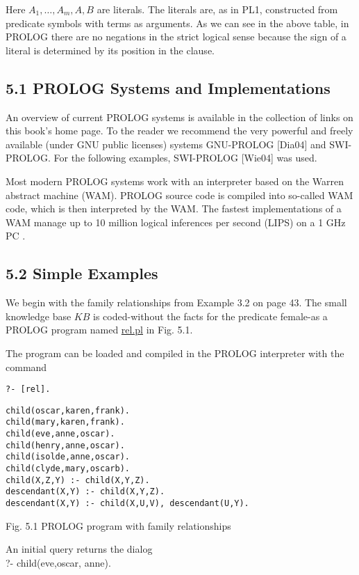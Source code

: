 \documentclass[10pt]{article}
\begin{document}
Here $A_{1}, \ldots, A_{m}, A, B$ are literals. The literals are, as in PL1, constructed from predicate symbols with terms as arguments. As we can see in the above table, in PROLOG there are no negations in the strict logical sense because the sign of a literal is determined by its position in the clause.

\subsection*{5.1 PROLOG Systems and Implementations}
An overview of current PROLOG systems is available in the collection of links on this book's home page. To the reader we recommend the very powerful and freely available (under GNU public licenses) systems GNU-PROLOG [Dia04] and SWI-PROLOG. For the following examples, SWI-PROLOG [Wie04] was used.

Most modern PROLOG systems work with an interpreter based on the Warren abstract machine (WAM). PROLOG source code is compiled into so-called WAM code, which is then interpreted by the WAM. The fastest implementations of a WAM manage up to 10 million logical inferences per second (LIPS) on a 1 GHz PC .

\subsection*{5.2 Simple Examples}
We begin with the family relationships from Example 3.2 on page 43. The small knowledge base $K B$ is coded-without the facts for the predicate female-as a PROLOG program named \href{http://rel.pl}{rel.pl} in Fig. 5.1.

The program can be loaded and compiled in the PROLOG interpreter with the command

\begin{verbatim}
?- [rel].
\end{verbatim}

\begin{verbatim}
child(oscar,karen,frank).
child(mary,karen,frank).
child(eve,anne,oscar).
child(henry,anne,oscar).
child(isolde,anne,oscar).
child(clyde,mary,oscarb).
child(X,Z,Y) :- child(X,Y,Z).
descendant(X,Y) :- child(X,Y,Z).
descendant(X,Y) :- child(X,U,V), descendant(U,Y).
\end{verbatim}

Fig. 5.1 PROLOG program with family relationships

An initial query returns the dialog\\
?- child(eve,oscar, anne).
\end{document}
